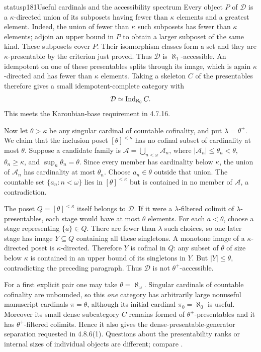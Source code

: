 \begin{dcomment}{status}{p181}{Useful cardinals and the accessibility spectrum}
Every object $P$ of $\mathcal D$ is a $\kappa$-directed union of its subposets having fewer than $\kappa$ elements and a greatest element. Indeed, the union of fewer than $\kappa$ such subposets has fewer than $\kappa$ elements; adjoin an upper bound in $P$ to obtain a larger subposet of the same kind. These subposets cover $P$. Their isomorphism classes form a set and they are $\kappa$-presentable by the criterion just proved. Thus $\mathcal D$ is $\aleph_1$-accessible. An idempotent on one of these presentables splits through its image, which is again $\kappa$-directed and has fewer than $\kappa$ elements. Taking a skeleton $C$ of the presentables therefore gives a small idempotent-complete category with
\[
 \mathcal D\simeq\operatorname{Ind}_{\aleph_0}C.
\]
This meets the Karoubian-base requirement in 4.7.16.

Now let $\theta>\kappa$ be any singular cardinal of countable cofinality, and put $\lambda=\theta^+$. We claim that the inclusion poset $[\theta]^{<\kappa}$ has no cofinal subset of cardinality at most $\theta$. Suppose a candidate family is $\mathscr A=\bigcup_{n<\omega}\mathscr A_n$, where $|\mathscr A_n|\leq\theta_n<\theta$, $\theta_n\geq\kappa$, and $\sup_n\theta_n=\theta$. Since every member has cardinality below $\kappa$, the union of $\mathscr A_n$ has cardinality at most $\theta_n$. Choose $a_n\in\theta$ outside that union. The countable set $\{a_n:n<\omega\}$ lies in $[\theta]^{<\kappa}$ but is contained in no member of $\mathscr A$, a contradiction.

The poset $Q=[\theta]^{<\kappa}$ itself belongs to $\mathcal D$. If it were a $\lambda$-filtered colimit of $\lambda$-presentables, each stage would have at most $\theta$ elements. For each $a<\theta$, choose a stage representing $\{a\}\in Q$. There are fewer than $\lambda$ such choices, so one later stage has image $Y\subseteq Q$ containing all these singletons. A monotone image of a $\kappa$-directed poset is $\kappa$-directed. Therefore $Y$ is cofinal in $Q$: any subset of $\theta$ of size below $\kappa$ is contained in an upper bound of its singletons in $Y$. But $|Y|\leq\theta$, contradicting the preceding paragraph. Thus $\mathcal D$ is not $\theta^+$-accessible.

For a first explicit pair one may take $\theta=\aleph_\omega$. Singular cardinals of countable cofinality are unbounded, so this \emph{one} category has arbitrarily large nonuseful manuscript cardinals $\pi=\theta$, although its initial cardinal $\pi_0=\aleph_0$ is useful. Moreover its small dense subcategory $C$ remains formed of $\theta^+$-presentables and it has $\theta^+$-filtered colimits. Hence it also gives the dense-presentable-generator separation requested in 4.8.6(1). Questions about the presentability ranks or internal sizes of individual objects are different; compare \citet[Definitions 2.5 and 2.10]{LiebermanRosickyVasey2019Sizes}.
\end{dcomment}


